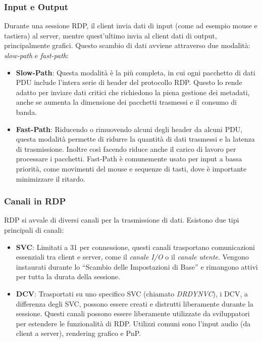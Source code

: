 \documentclass[12pt,a4paper,openright,twoside]{book}
\begin{document}
\subsubsection{Input e Output}
Durante una sessione \ac{RDP}, il client invia dati di input (come ad esempio mouse e tastiera) al server, mentre quest'ultimo invia al client dati di output, principalmente grafici.
Questo scambio di dati avviene attraverso due modalità: \textit{slow-path} e \textit{fast-path}:
\begin{itemize}
    \item \textbf{Slow-Path}: Questa modalità è la più completa, in cui ogni pacchetto di dati \ac{PDU} include l'intera serie di header del protocollo \ac{RDP}.
    Questo lo rende adatto per inviare dati critici che richiedono la piena gestione dei metadati, anche se aumenta la dimensione dei pacchetti trasmessi e il consumo di banda.
    \item \textbf{Fast-Path}: Riducendo o rimuovendo alcuni degli header da alcuni \ac{PDU},
    questa modalità permette di ridurre la quantità di dati trasmessi e la latenza di trasmissione.
    Inoltre così facendo riduce anche il carico di lavoro per processare i pacchetti.
    Fast-Path è comunemente usato per input a bassa priorità, come movimenti del mouse e sequenze di tasti, dove è importante minimizzare il ritardo.
\end{itemize}

\subsubsection{Canali in RDP}
\ac{RDP} si avvale di diversi canali per la trasmissione di dati. Esistono due tipi principali di canali:
\begin{itemize}
    \item \textbf{\ac{SVC}}: Limitati a 31 per connessione,
    questi canali trasportano comunicazioni essenziali tra client e server, come il \emph{canale I/O} o il \emph{canale utente}. Vengono instaurati durante lo ``Scambio delle Impostazioni di Base'' e rimangono attivi per tutta la durata della sessione.
    \item \textbf{\ac{DCV}}: Trasportati su uno specifico \ac{SVC} (chiamato \emph{DRDYNVC}),
    i \ac{DCV}, a differenza degli \ac{SVC},
    possono essere creati e distrutti liberamente durante la sessione.
    Questi canali possono essere liberamente utilizzate da sviluppatori per estendere le funzionalità di \ac{RDP}.
    Utilizzi comuni sono l'input audio (da client a server), rendering grafico e PnP.
\end{itemize}
\end{document}
